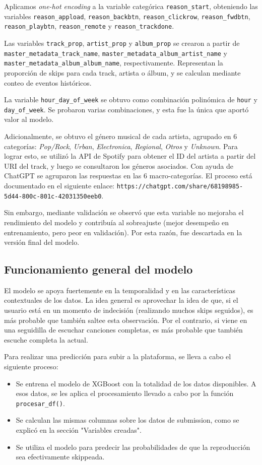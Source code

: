 \documentclass{article}
\begin{document}
Aplicamos \textit{one-hot encoding} a la variable categórica \texttt{reason\_start}, obteniendo las variables \texttt{reason\_appload}, \texttt{reason\_backbtn}, \texttt{reason\_clickrow}, \texttt{reason\_fwdbtn}, \texttt{reason\_playbtn}, \texttt{reason\_remote} y \texttt{reason\_trackdone}.

Las variables \texttt{track\_prop}, \texttt{artist\_prop} y \texttt{album\_prop} se crearon a partir de \texttt{master\_metadata\_track\_name}, \texttt{master\_metadata\_album\_artist\_name} y \texttt{master\_metadata\_album\_album\_name}, respectivamente. Representan la proporción de skips para cada track, artista o álbum, y se calculan mediante conteo de eventos históricos.

La variable \texttt{hour\_day\_of\_week} se obtuvo como combinación polinómica de \texttt{hour} y \texttt{day\_of\_week}. Se probaron varias combinaciones, y esta fue la única que aportó valor al modelo.

Adicionalmente, se obtuvo el género musical de cada artista, agrupado en 6 categorías: \textit{Pop/Rock}, \textit{Urban}, \textit{Electronica}, \textit{Regional}, \textit{Otros} y \textit{Unknown}. Para lograr esto, se utilizó la API de Spotify para obtener el ID del artista a partir del URI del track, y luego se consultaron los géneros asociados. Con ayuda de ChatGPT se agruparon las respuestas en las 6 macro-categorías. El proceso está documentado en el siguiente enlace: \texttt{https://chatgpt.com/share/68198985-5d44-800c-801c-42031350eeb0}.

Sin embargo, mediante validación se observó que esta variable no mejoraba el rendimiento del modelo y contribuía al sobreajuste (mejor desempeño en entrenamiento, pero peor en validación). Por esta razón, fue descartada en la versión final del modelo.

\subsection*{Funcionamiento general del modelo}
El modelo se apoya fuertemente en la temporalidad y en las características contextuales de los datos. La idea general es aprovechar la idea de que, si el usuario está en un momento de indecisión (realizando muchos skips seguidos), es más probable que también saltee esta observación. Por el contrario, si viene en una seguidilla de escuchar canciones completas, es más probable que también escuche completa la actual.

Para realizar una predicción para subir a la plataforma, se lleva a cabo el siguiente proceso:
\begin{itemize}
	\item Se entrena el modelo de XGBoost con la totalidad de los datos disponibles. A esos datos, se les aplica el procesamiento llevado a cabo por la función \texttt{procesar\_df()}.
	\item Se calculan las mismas columnas sobre los datos de submission, como se explicó en la sección "Variables creadas".
	\item Se utiliza el modelo para predecir las probabilidades de que la reproducción sea efectivamente skippeada.
\end{itemize}
\end{document}
